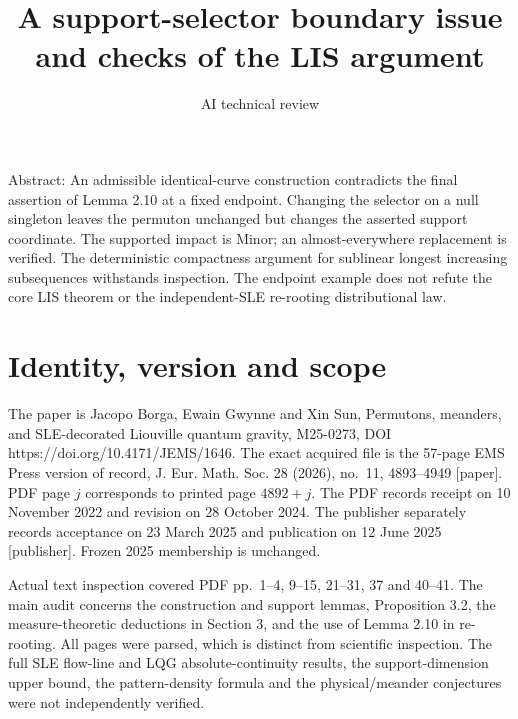 \documentclass[10pt]{article}
\title{A support-selector boundary issue and checks of the LIS argument}
\author{AI technical review}
\date{}
\begin{document}
\maketitle
Abstract: An admissible identical-curve construction contradicts the final assertion of Lemma 2.10 at a fixed endpoint. Changing the selector on a null singleton leaves the permuton unchanged but changes the asserted support coordinate. The supported impact is Minor; an almost-everywhere replacement is verified. The deterministic compactness argument for sublinear longest increasing subsequences withstands inspection. The endpoint example does not refute the core LIS theorem or the independent-SLE re-rooting distributional law.\par
\section*{Identity, version and scope}
The paper is Jacopo Borga, Ewain Gwynne and Xin Sun, Permutons, meanders, and SLE-decorated Liouville quantum gravity, M25-0273, DOI https://doi.org/10.4171/JEMS/1646. The exact acquired file is the 57-page EMS Press version of record, J. Eur. Math. Soc. 28 (2026), no. 11, 4893–4949 [paper]. PDF page \(j\) corresponds to printed page \(4892+j\). The PDF records receipt on 10 November 2022 and revision on 28 October 2024. The publisher separately records acceptance on 23 March 2025 and publication on 12 June 2025 [publisher]. Frozen 2025 membership is unchanged.\par
Actual text inspection covered PDF pp. 1–4, 9–15, 21–31, 37 and 40–41. The main audit concerns the construction and support lemmas, Proposition 3.2, the measure-theoretic deductions in Section 3, and the use of Lemma 2.10 in re-rooting. All pages were parsed, which is distinct from scientific inspection. The full SLE flow-line and LQG absolute-continuity results, the support-dimension upper bound, the pattern-density formula and the physical/meander conjectures were not independently verified.\par
\end{document}
